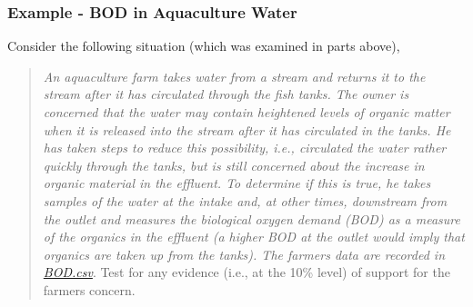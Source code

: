 \documentclass[10pt,openany]{book}\usepackage[]{graphicx}\usepackage[]{color}
\begin{document}
\subsubsection{Example - BOD in Aquaculture Water}
Consider the following situation (which was examined in parts above),
\begin{quote}
\textsl{An aquaculture farm takes water from a stream and returns it to the stream after it has circulated through the fish tanks.  The owner is concerned that the water may contain heightened levels of organic matter when it is released into the stream after it has circulated in the tanks.  He has taken steps to reduce this possibility, i.e., circulated the water rather quickly through the tanks, but is still concerned about the increase in organic material in the effluent.  To determine if this is true, he takes samples of the water at the intake and, at other times, downstream from the outlet and measures the biological oxygen demand (BOD) as a measure of the organics in the effluent (a higher BOD at the outlet would imply that organics are taken up from the tanks).  The farmers data are recorded in \href{https://raw.githubusercontent.com/droglenc/NCData/master/BOD.csv}{BOD.csv}}.  Test for any evidence (i.e., at the 10\% level) of support for the farmers concern.
\end{quote}
\end{document}
